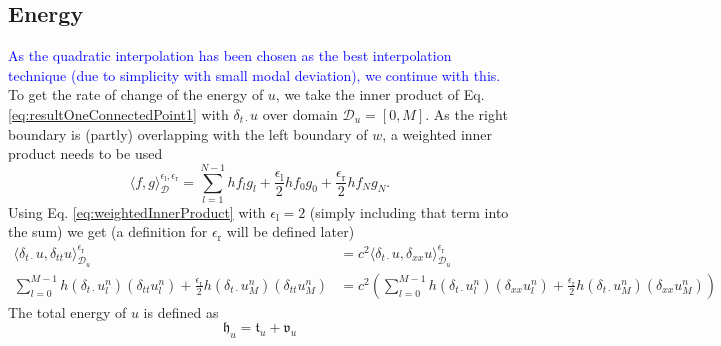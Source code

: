 \documentclass[dvipsnames]{article}
\def\SWcomment[#1]{\textcolor{blue}{#1}}
\begin{document}
\subsection{Energy}
\SWcomment[As the quadratic interpolation has been chosen as the best interpolation technique (due to simplicity with small modal deviation), we continue with this.] To get the rate of change of the energy of $u$, we take the inner product of Eq. \eqref{eq:resultOneConnectedPoint1} with $\delta_{t\cdot}u$ over domain $\mathcal{D}_u = [0, M]$. As the right boundary is (partly) overlapping with the left boundary of $w$, a weighted inner product needs to be used
\begin{equation}\label{eq:weightedInnerProduct}
    \langle f,g \rangle_{\mathcal{D}}^{\epsilon_\text{l}, \epsilon_\text{r}}= \sum_{l = 1}^{N-1}hf_lg_l + \frac{\epsilon_\text{l}}{2}hf_0g_0 + \frac{\epsilon_\text{r}}{2}hf_Ng_N.
\end{equation}
Using Eq. \eqref{eq:weightedInnerProduct} with $\epsilon_\text{l} = 2$ (simply including that term into the sum) we get (a definition for $\epsilon_\text{r}$ will be defined later)
\begin{align*}
    \langle \delta_{t\cdot}u, \delta_{tt}u\rangle_{\mathcal{D}_u}^{\epsilon_\text{r}} &= c^2 \langle \delta_{t\cdot}u, \delta_{xx}u\rangle_{\mathcal{D}_u}^{\epsilon_\text{r}}\\
    \sum_{l = 0}^{M-1}h(\delta_{t\cdot}u_l^n)(\delta_{tt}u_l^n) + \frac{\epsilon_\text{r}}{2}h(\delta_{t\cdot}u_M^n)(\delta_{tt}u_M^n) &= c^2\left(\sum_{l = 0}^{M-1}h(\delta_{t\cdot}u_l^n)(\delta_{xx}u_l^n) + \frac{\epsilon_\text{r}}{2}h(\delta_{t\cdot}u_M^n)(\delta_{xx}u_M^n)\right)
\end{align*}
The total energy of $u$ is defined as
\begin{equation}
    \mathfrak{h}_u = \mathfrak{t}_u + \mathfrak{v}_u
\end{equation}
\end{document}
